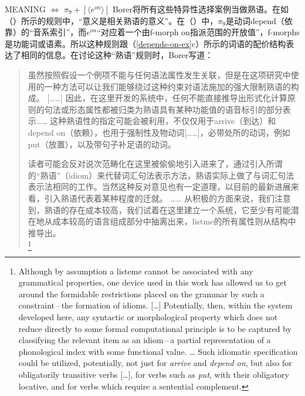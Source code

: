 \begin{exe}
\begin{xlist}[iv.]
\begin{exe}
\begin{xlist}[iv.]
\ea
MEANING $\Leftrightarrow$ $\pi_9 + [ \langle e^{on} \rangle ]$  
\z
Borer将所有这些特异性选择案例当做熟语。在如（）所示的规则中，“意义是相关熟语的意义”\citep[Vol.\ II，第27页]{Borer2005a-u}。在（）中，$\pi_9$是动词depend（依靠）的“音系索引”，而$e^{on}$“对应着一个由f-morph on指派范围的开放值”\citep[Vol.\ II, 第29页]{Borer2005a-u}，f-morphs是功能词或语素。所以这种规则跟（\ref{depends-on-ex}c）所示的词语的配价结构表达了相同的信息。在讨论这种“熟语”规则时，Borer写道：

\begin{quotation}
虽然按照假设一个例项不能与任何语法属性发生关联，但是在这项研究中使用的一种方法可以让我们能够绕过这种约束对语法施加的强大限制\cndash{}熟语的构成。 [……] 
因此，在这里开发的系统中，任何不能直接推导出形式化计算原则的句法或形态属性都被归类为熟语\cndah{}具有某种功能值的语音标引的部分表示…… 
这种熟语性的指定可能会被利用，不仅仅用于arrive（到达）和depend on（依赖），也用于强制性及物动词[……]，必带处所的动词，例如put（放置），以及带句子补足语的动词。

读者可能会反对说次范畴化在这里被偷偷地引入进来了，通过引入所谓的“熟语”（idiom）来代替词汇句法表示方法，熟语实际上做了与词汇句法表示法相同的工作。当然这种反对意见也有一定道理，以目前的最新进展来看，引入熟语代表着某种程度的迁就。
……  从积极的方面来说，我们注意到，熟语的存在成本较高，我们试着在这里建立一个系统，它至少有可能潜在地从成本较高的语言组成部分中抽离出来，listme的所有属性则从结构中推导出。
  \\ \citep[Vol. II，第354--355页]{Borer2005a-u}\footnote{%
Although by assumption a listeme cannot be associated with any grammatical properties, one device used in this work has allowed us to get around the formidable restrictions placed on the grammar by such a constraint\,--\,the formation of idioms.  [\ldots] 
Potentially, then, within the system developed here, any syntactic or morphological property which does not reduce directly to some formal computational principle is to be captured by classifying the relevant item as an idiom\,--\,a partial representation of a phonological index with some functional value. \ldots 
Such idiomatic specification could be utilized, potentially, not just for \emph{arrive} and \emph{depend on}, but also for obligatorily transitive verbs [\ldots], for verbs such as \emph{put}, with their obligatory locative, and for verbs which require a sentential complement.

}
\end{quotation}
\end{xlist}
\end{exe}
\end{xlist}
\end{exe}
